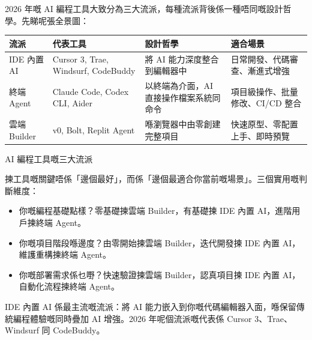 


2026 年嘅 AI 編程工具大致分為三大流派，每種流派背後係一種唔同嘅設計哲學。先睇呢張全景圖：

\begin{center}
\begin{tabularx}{\linewidth}{|X|X|X|X|}
\hline
\textbf{流派} & \textbf{代表工具} & \textbf{設計哲學} & \textbf{適合場景} \tabularnewline
\hline
IDE 內置 AI & Cursor 3, Trae, Windsurf, CodeBuddy & 將 AI 能力深度整合到編輯器中 & 日常開發、代碼審查、漸進式增強 \tabularnewline
終端 Agent & Claude Code, Codex CLI, Aider & 以終端為介面，AI 直接操作檔案系統同命令 & 項目級操作、批量修改、CI/CD 整合 \tabularnewline
雲端 Builder & v0, Bolt, Replit Agent & 喺瀏覽器中由零創建完整項目 & 快速原型、零配置上手、即時預覽 \tabularnewline
\hline
\end{tabularx}
\end{center}

\begin{center}\small\color{gray}AI 編程工具嘅三大流派\end{center}

揀工具嘅關鍵唔係「邊個最好」，而係「邊個最適合你當前嘅場景」。三個實用嘅判斷維度：

\begin{itemize}
  \item 你嘅編程基礎點樣？零基礎揀雲端 Builder，有基礎揀 IDE 內置 AI，進階用戶揀終端 Agent。
  \item 你嘅項目階段喺邊度？由零開始揀雲端 Builder，迭代開發揀 IDE 內置 AI，維護重構揀終端 Agent。
  \item 你嘅部署需求係乜嘢？快速驗證揀雲端 Builder，認真項目揀 IDE 內置 AI，自動化流程揀終端 Agent。
\end{itemize}


IDE 內置 AI 係最主流嘅流派：將 AI 能力嵌入到你嘅代碼編輯器入面，喺保留傳統編程體驗嘅同時疊加 AI 增強。2026 年呢個流派嘅代表係 Cursor 3、Trae、Windsurf 同 CodeBuddy。


